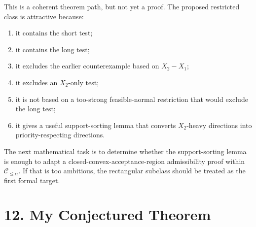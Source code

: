 \documentclass[11pt]{article}
\begin{document}
This is a coherent theorem path, but not yet a proof. The proposed restricted class is attractive because:
\begin{enumerate}[label=(\roman*)]
\item it contains the short test;
\item it contains the long test;
\item it excludes the earlier counterexample based on \(X_2-X_1\);
\item it excludes an \(X_2\)-only test;
\item it is not based on a too-strong feasible-normal restriction that would exclude the long test;
\item it gives a useful support-sorting lemma that converts \(X_2\)-heavy directions into priority-respecting directions.
\end{enumerate}

The next mathematical task is to determine whether the support-sorting lemma is enough to adapt a closed-convex-acceptance-region admissibility proof within \(\mathcal C_{\le\alpha}\). If that is too ambitious, the rectangular subclass should be treated as the first formal target.

\section*{12. My Conjectured Theorem}

\medskip
\noindent
{}

\medskip
\noindent
{}
\end{document}
